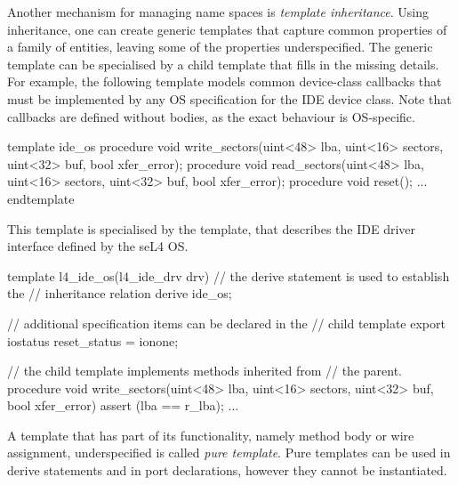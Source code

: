 Another mechanism for managing name spaces is \emph{template 
inheritance}.  Using inheritance, one can create generic templates 
that capture common properties of a family of entities, leaving 
some of the properties underspecified.  The generic template can 
be specialised by a child template that fills in the missing 
details.  For example, the following template models common 
device-class callbacks that must be implemented by any OS 
specification for the IDE device class.  Note that callbacks are 
defined without bodies, as the exact behaviour is OS-specific.
\begin{tsllisting2}
template ide_os
  procedure void write_sectors(uint<48> lba, 
    uint<16> sectors, uint<32> buf, bool xfer_error);
  procedure void read_sectors(uint<48> lba, 
    uint<16> sectors, uint<32> buf, bool xfer_error);
  procedure void reset();
  ...
endtemplate
\end{tsllisting2}
This template is specialised by the  template,
that describes the IDE driver interface defined by the seL4 OS.
\begin{tsllisting2}
template l4_ide_os(l4_ide_drv drv)
  // the derive statement is used to establish the 
  // inheritance relation
  derive ide_os;

  // additional specification items can be declared in the 
  // child template
  export iostatus reset_status = ionone;

  // the child template implements methods inherited from 
  // the parent.
  procedure void write_sectors(uint<48> lba, 
    uint<16> sectors, uint<32> buf, bool xfer_error)
  {
    assert (lba == r_lba);
    ...
  }
\end{tsllisting2}

A template that has part of its functionality, namely method body 
or wire assignment, underspecified is called \emph{pure template}.  
Pure templates can be used in derive statements and in port 
declarations, however they cannot be instantiated.


